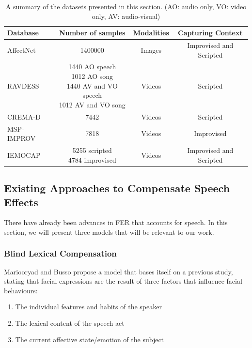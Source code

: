 \begin{table}[h!]
    \centering
    \begin{tabular}{lccc}
    \hline
       \textbf{Database}  & \textbf{Number of samples} & \textbf{Modalities} & \textbf{Capturing Context} \\
    \hline
        AffectNet & 1400000 & Images & Improvised and Scripted \\ \hline
        RAVDESS & \makecell{1440 AO speech \\ 1012 AO song \\ 1440 AV and VO speech \\ 1012 AV and VO song}  & Videos & Scripted \\ \hline
        CREMA-D & 7442  & Videos & Scripted \\ \hline
        MSP-IMPROV & 7818  & Videos & Improvised \\ \hline
        IEMOCAP & \makecell{5255 scripted \\ 4784 improvised}  & Videos & Improvised and Scripted \\ \hline
    \end{tabular}
    \caption{A summary of the datasets presented in this section. (AO: audio only, VO: video only, AV: audio-visual)}
    \label{tab:dataset_summary}
\end{table}

\subsection{Existing Approaches to Compensate Speech Effects}
\label{sec:existing}
There have already been advances in FER that accounts for speech. In this section, we will present three models that will be relevant to our work.

\subsubsection{Blind Lexical Compensation}
Mariooryad and Busso \cite{mariooryad2015facial} propose a model that bases itself on a previous study, stating that facial expressions are the result of three factors that influence facial behaviours:

\begin{enumerate}
    \item The individual features and habits of the speaker
    \item The lexical content of the speech act
    \item The current affective state/emotion of the subject
\end{enumerate}

